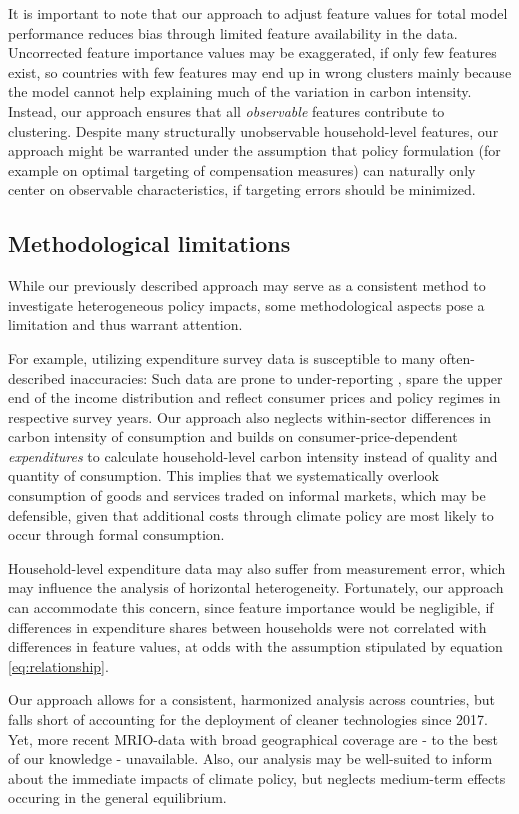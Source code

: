 \documentclass[12pt, a4paper]{article}
\begin{document}
It is important to note that our approach to adjust feature values for total model performance reduces bias through limited feature availability in the data. Uncorrected feature importance values may be exaggerated, if only few features exist, so countries with few features may end up in wrong clusters mainly because the model cannot help explaining much of the variation in carbon intensity. Instead, our approach ensures that all \textit{observable} features contribute to clustering. Despite many structurally unobservable household-level features, our approach might be warranted under the assumption that policy formulation (for example on optimal targeting of compensation measures) can naturally only center on observable characteristics, if targeting errors should be minimized.

\subsection{Methodological limitations}

While our previously described approach may serve as a consistent method to investigate heterogeneous policy impacts, some methodological aspects pose a limitation and thus warrant attention.

For example, utilizing expenditure survey data is susceptible to many often-described inaccuracies: Such data are prone to under-reporting \autocite{Meyer.2015}, spare the upper end of the income distribution \autocite{Blanchet.2022} and reflect consumer prices and policy regimes in respective survey years. Our approach also neglects within-sector differences in carbon intensity of consumption and builds on consumer-price-dependent \textit{expenditures} to calculate household-level carbon intensity instead of quality and quantity of consumption. This implies that we systematically overlook consumption of goods and services traded on informal markets, which may be defensible, given that additional costs through climate policy are most likely to occur through formal consumption.

Household-level expenditure data may also suffer from measurement error, which may influence the analysis of horizontal heterogeneity. Fortunately, our approach can accommodate this concern, since feature importance would be negligible, if differences in expenditure shares between households were not correlated with differences in feature values, at odds with the assumption stipulated by equation \ref{eq:relationship}.

Our approach allows for a consistent, harmonized analysis across countries, but falls short of accounting for the deployment of cleaner technologies since 2017. Yet, more recent MRIO-data with broad geographical coverage are - to the best of our knowledge - unavailable. Also, our analysis may be well-suited to inform about the immediate impacts of climate policy, but neglects medium-term effects occuring in the general equilibrium. 
\end{document}
